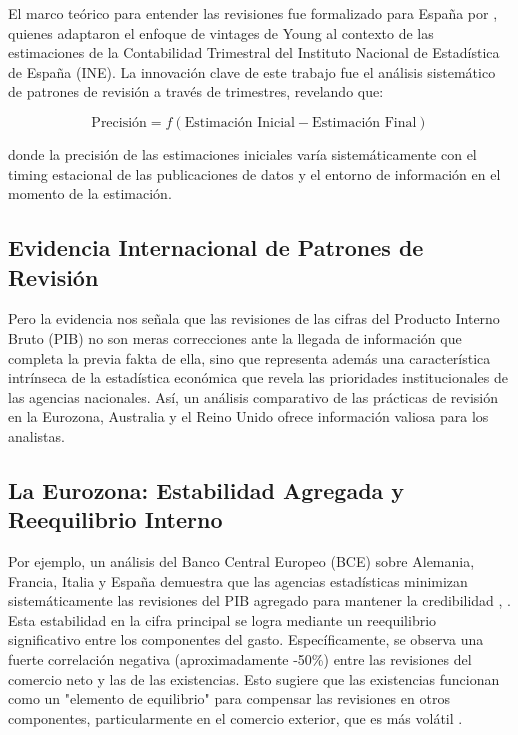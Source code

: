 \documentclass{article}
\begin{document}
El marco teórico para entender las revisiones fue formalizado para España por \citet{pavia2017}, quienes adaptaron el enfoque de vintages de Young al contexto de las estimaciones de la Contabilidad Trimestral del Instituto Nacional de Estadística de España (INE). La innovación clave de este trabajo fue el análisis sistemático de patrones de revisión a través de trimestres, revelando que:

\begin{equation}
\text{Precisión} = f(\text{Estimación Inicial} - \text{Estimación Final})
\end{equation}

donde la precisión de las estimaciones iniciales varía sistemáticamente con el timing estacional de las publicaciones de datos y el entorno de información en el momento de la estimación.

\subsection{Evidencia Internacional de Patrones de Revisión}

Pero la evidencia nos señala que las revisiones de las cifras del Producto Interno Bruto (PIB) no son meras correcciones ante la llegada de información que completa la previa fakta de ella, sino que representa además una característica intrínseca de la estadística económica que revela las prioridades institucionales de las agencias nacionales. Así, un análisis comparativo de las prácticas de revisión en la Eurozona, Australia y el Reino Unido ofrece información valiosa para los analistas.

\subsection*{La Eurozona: Estabilidad Agregada y Reequilibrio Interno}
Por ejemplo, un análisis del Banco Central Europeo (BCE) sobre Alemania, Francia, Italia y España demuestra que las agencias estadísticas minimizan sistemáticamente las revisiones del PIB agregado para mantener la credibilidad \cite{bce_wp_2857}, \cite{suerf_pb_807}. Esta estabilidad en la cifra principal se logra mediante un reequilibrio significativo entre los componentes del gasto. Específicamente, se observa una fuerte correlación negativa (aproximadamente -50\%) entre las revisiones del comercio neto y las de las existencias. Esto sugiere que las existencias funcionan como un "elemento de equilibrio" para compensar las revisiones en otros componentes, particularmente en el comercio exterior, que es más volátil \cite{bce_wp_2857}.
\end{document}
